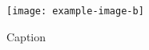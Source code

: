 \documentclass{article}
\begin{document}
\begin{figure}
  \texttt{[image: example-image-b]}%
  \caption{Caption}
  \label{fig:key}
\end{figure}
\end{document}
